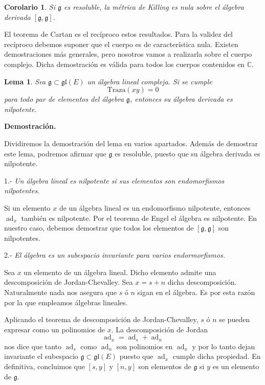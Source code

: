 \documentclass[a4paper,draft,12pt]{article}
\newtheorem{lema}[teo]{Lema}%
\newtheorem{cor}[teo]{Corolario}%
\newcommand{\dem}{\noindent \textbf{Demostración. }\vspace{0.3 cm}}%
\newcommand{\C}{\mathbb{C}}%
\newcommand{\g}{\mathfrak{g}}%
\DeclareMathOperator{\ad}{ad}  %
\begin{document}
 \begin{cor}
 
 Si $\g$ es resoluble, la métrica de Killing es nula sobre el álgebra derivada $[\g,\g]$.
 
 \end{cor}
 

 
 
 
 
 
 
 El teorema de Cartan es el recíproco estos resultados.  Para la validez del recíproco debemos suponer que el cuerpo es de característica nula.  Existen demostraciones más generales, pero nosotros vamos a realizarla sobre el cuerpo complejo.  Dicha demostración es válida para todos los cuerpos contenidos en $\C$.
 
 \begin{lema}
 
 Sea $\g \subset \mathfrak{gl}(E)$ un álgebra lineal compleja.  Si se cumple
 $$
 \mathrm{Traza}(xy)=0
 $$
 para todo par de elementos del álgebra $\g$, entonces su álgebra derivada es nilpotente.
 
 \end{lema}
 
 \dem
 
 Dividiremos la demostración del lema en varios apartados. Además de demostrar este lema, podremos afirmar que $\g$ es resoluble, puesto que su álgebra derivada es nilpotente.
 
 \bigskip
 
 1.- \textit{Un álgebra lineal es nilpotente si sus elementos son endomorfismos nilpotentes}.
 
   Si un elemento $x$ de un álgebra lineal es un endomorfismo nilpotente, entonces $\ad_x$ también es nilpotente.  Por el teorema de Engel el álgebra es nilpotente. En nuestro caso, debemos demostrar  que todos los elementos de $[\g,\g]$ son nilpotentes.
 
 \bigskip
 
 2.- \textit{El álgebra es un subespacio invariante para varios endormorfismos.}
 
 
 
 Sea $x $ un elemento de un álgebra lineal.  Dicho elemento admite una descomposición de Jordan-Cheva\-lley.  Sea $x = s+n$ dicha descomposición.  Naturalmente nada nos asegura que $s$ ó $n$ sigan en el álgebra. Es por esta razón por la que empleamos álgebras lineales. 
 
 Aplicando el teorema de descomposición de Jordan-Chevalley,  $s$ ó $n$ se pueden expresar como un polinomios de $x$.    La descomposición de Jordan 
 $$
 \ad_x=\ad_s+\ad_n
 $$  nos dice que tanto $\ad_s$ como $\ad_n$ son polinomios en $\ad_x$ y por lo tanto dejan invariante el subespacio $\g\subset \mathfrak{gl}(E)$ puesto que $\ad_x$ cumple dicha propiedad. En definitiva, concluimos que $[s,y]$ y $[n,y]$ son elementos de $\g$ si $y$ es un elemento de $\g$.
 
\end{document}
